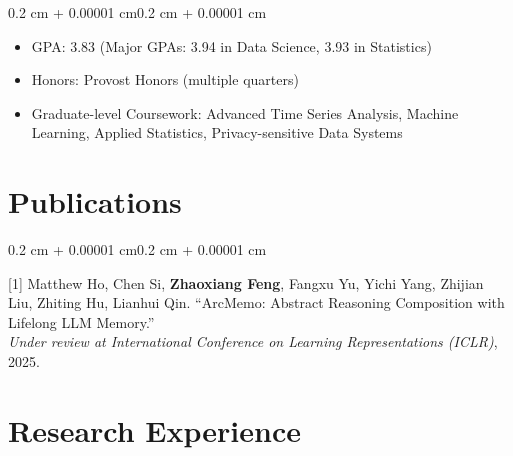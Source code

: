 \documentclass[10pt, letterpaper]{article}
\newenvironment{highlights}{
    \begin{itemize}[
        topsep=0.10 cm,
        parsep=0.10 cm,
        partopsep=0pt,
        itemsep=0pt,
        leftmargin=0.4 cm + 10pt
    ]
}{\end{itemize}}
\newenvironment{onecolentry}{
    \begin{adjustwidth}{0.2 cm + 0.00001 cm}{0.2 cm + 0.00001 cm}
}{\end{adjustwidth}}
\let\hrefWithoutArrow\href
\renewcommand{\href}[2]{\hrefWithoutArrow{#1}{\ifthenelse{\equal{#2}{}}{ }{#2}}}
\begin{document}
    \vspace{0.10 cm}
    \begin{onecolentry}
        \begin{highlights}
            \item GPA: 3.83 (Major GPAs: 3.94 in Data Science, 3.93 in Statistics)
            \item Honors: Provost Honors (multiple quarters)
            \item Graduate-level Coursework: Advanced Time Series Analysis, Machine Learning, Applied Statistics, Privacy-sensitive Data Systems
        \end{highlights}
    \end{onecolentry}

    \section{Publications}
    
    \begin{onecolentry}
        [1] Matthew Ho, Chen Si, \textbf{Zhaoxiang Feng}, Fangxu Yu, Yichi Yang, Zhijian Liu, Zhiting Hu, Lianhui Qin. ``ArcMemo: Abstract Reasoning Composition with Lifelong LLM Memory.''\\
        \textit{Under review at International Conference on Learning Representations (ICLR)}, 2025. \hfill {\color{black}\href{https://arxiv.org/abs/2509.04439}{[Paper]}} {\color{black}\href{https://github.com/matt-seb-ho/arc_memo}{[Code]}}
    \end{onecolentry}

\section{Research Experience}
\end{document}
